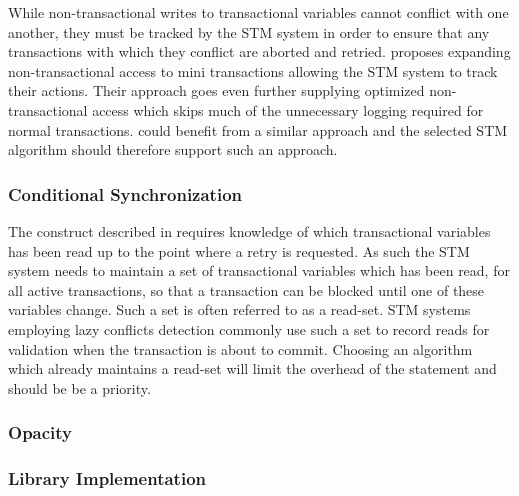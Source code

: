 While non-transactional writes to transactional variables cannot conflict with one another, they must be tracked by the \ac{STM} system in order to ensure that any transactions with which they conflict are aborted and retried. \cite{hindman2006atomicity} proposes expanding non-transactional access to mini transactions allowing the \ac{STM} system to track their actions. Their approach goes even further supplying optimized non-transactional access which skips much of the unnecessary logging required for normal transactions. \stmnamesp could benefit from a similar approach and the selected \ac{STM} algorithm should therefore support such an approach.
 
\subsubsection{Conditional Synchronization}
The  construct described in  requires knowledge of which transactional variables has been read up to the point where a retry is requested\cite{harris2005composable}. As such the \ac{STM} system needs to maintain a set of transactional variables which has been read, for all active transactions, so that a transaction can be blocked until one of these variables change. Such a set is often referred to as a read-set\cite{dice2006transactional}\cite{harris2010transactional}\cite{herlihy2012art}. \ac{STM} systems employing lazy conflicts detection commonly use such a set to record reads for validation when the transaction is about to commit\cite{dice2006transactional}\cite{mohamedin2013bytestm}. Choosing an algorithm which already maintains a read-set will limit the overhead of the  statement and should be be a priority.

\subsubsection{Opacity}
\subsubsection{Library Implementation}


